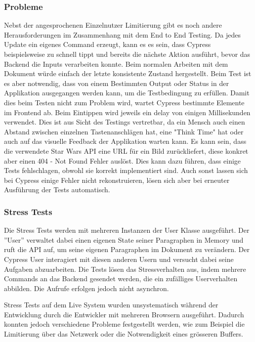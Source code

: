 \subsubsection{Probleme}
Nebst der angesprochenen Einzelnutzer Limitierung gibt es noch andere Herausforderungen im Zusammenhang mit dem End to End Testing.
Da jedes Update ein eigenes Command erzeugt, kann es es sein, dass Cypress beispielsweise zu schnell tippt und bereits die n\"achste Aktion ausf\"uhrt, bevor das Backend die Inputs verarbeiten konnte.
Beim normalen Arbeiten mit dem Dokument w\"urde einfach der letzte konsistente Zustand hergestellt.
Beim Test ist es aber notwendig, dass von einem Bestimmten Output oder Status in der Applikation ausgegangen werden kann, um die Testbedingung zu erf\"ullen.
Damit dies beim Testen nicht zum Problem wird, wartet Cypress bestimmte Elemente im Frontend ab.
Beim Eintippen wird jeweils ein delay von einigen Millisekunden verwendet.
Dies ist aus Sicht des Testings vertretbar, da ein Mensch auch einen Abstand zwischen einzelnen Tastenanschl\"agen hat, eine "Think Time" hat oder auch auf das visuelle Feedback der Applikation warten kann.
Es kann sein, dass die verwendete Star Wars API eine URL für ein Bild zurückliefert, diese konkret aber einen 404 - Not Found Fehler auslöst.
Dies kann dazu führen, dass einige Tests fehlschlagen, obwohl sie korrekt implementiert sind.
Auch sonst lassen sich bei Cypress einige Fehler nicht rekonstruieren, lösen sich aber bei erneuter Ausführung der Tests automatisch.

\subsubsection{Stress Tests}
Die Stress Tests werden mit mehreren Instanzen der User Klasse ausgef\"uhrt.
Der ''User'' verwaltet dabei einen eigenen State seiner Paragraphen in Memory und ruft die API auf, um seine eigenen Paragraphen im Dokument zu ver\"andern.
Der Cypress User interagiert mit diesen anderen Usern und versucht dabei seine Aufgaben abzuarbeiten.
Die Tests lösen das Stressverhalten aus, indem mehrere Commands an das Backend gesendet werden, die ein zufälliges Userverhalten abbilden.
Die Aufrufe erfolgen jedoch nicht asynchron.

Stress Tests auf dem Live System wurden unsystematisch w\"ahrend der Entwicklung durch die Entwickler mit mehreren Browsern ausgef\"uhrt.
Dadurch konnten jedoch verschiedene Probleme festgestellt werden, wie zum Beispiel die Limitierung \"uber das Netzwerk oder die Notwendigkeit eines gr\"osseren Buffers.

